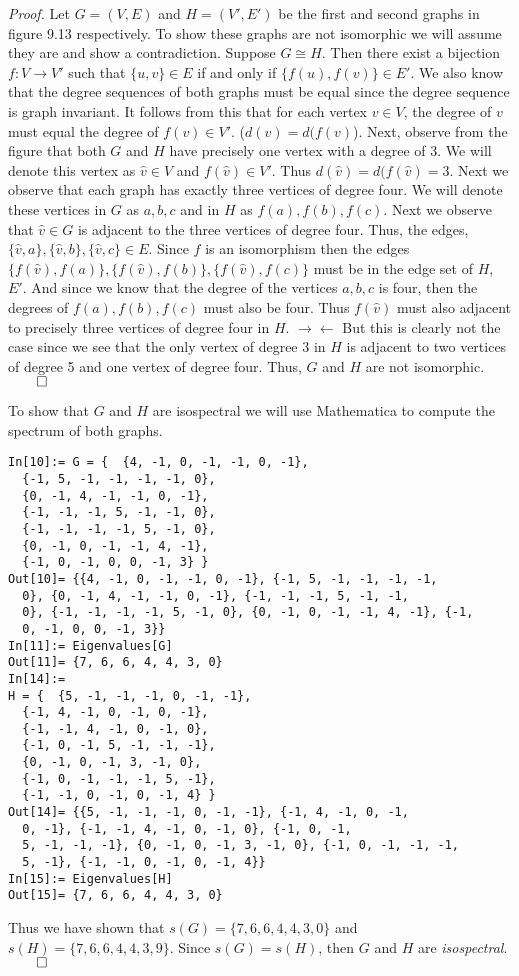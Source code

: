 \documentclass{article}
\begin{document}
\textit{Proof.} Let \(G=(V,E)\) and \(H= (V',E')\) be the first and second graphs in figure 9.13 respectively. To show these graphs are not isomorphic we will assume they are and show a contradiction. Suppose \(G\cong H\). Then there exist a bijection \(f:V\rightarrow V'\) such that \(\{u,v\} \in E\) if and only if \( \{f(u),f(v)\}  \in E'\). We also know that the degree sequences of both graphs must be equal since the degree sequence is graph invariant. It follows from this that for each vertex \(v \in V\), the degree of \(v\) must equal the degree of \( f(v)\in V' \). (\(d(v)=d(f(v)\)). Next, observe from the figure that both \(G\) and \(H\) have precisely one vertex with a degree of 3. We will denote this vertex as \(\hat v \in V\) and \(f(\hat v) \in V'\). Thus \(d(\hat v) = d(f(\hat v) = 3\). Next we observe that each graph has exactly three vertices of degree four. We will denote these vertices in \(G\) as \(a,b,c\) and in \(H\) as \(f(a),f(b),f(c)\). Next we observe that \(\hat v \in G\) is adjacent to the three vertices of degree four. Thus, the edges, \( \{\hat v, a\}, \{\hat v, b\}, \{\hat v,c\} \in E\). Since \(f\) is an isomorphism then the edges \(\{f(\hat v), f(a)\}, \{f(\hat v), f(b)\}, \{f(\hat v),f(c)\}\) must be in the edge set of \(H\), \(E'\). And since we know that the degree of the vertices \(a,b,c\) is four, then the degrees of \(f(a),f(b),f(c)\) must also be four. Thus \(f(\hat v)\) must also adjacent to precisely three vertices of degree four in \(H\). \(\rightarrow\!\leftarrow\) But this is clearly not the case since we see that the only vertex of degree 3 in \(H\) is adjacent to two vertices of degree 5 and one vertex of degree four. Thus, \(G\) and \(H\) are not isomorphic. \(\qed\)


\vspace{3mm} To show that \(G\) and \(H\) are isospectral we will use Mathematica to compute the spectrum of both graphs. 
\begin{verbatim}
In[10]:= G = {  {4, -1, 0, -1, -1, 0, -1},
  {-1, 5, -1, -1, -1, -1, 0},
  {0, -1, 4, -1, -1, 0, -1},
  {-1, -1, -1, 5, -1, -1, 0},
  {-1, -1, -1, -1, 5, -1, 0},
  {0, -1, 0, -1, -1, 4, -1},
  {-1, 0, -1, 0, 0, -1, 3} }
Out[10]= {{4, -1, 0, -1, -1, 0, -1}, {-1, 5, -1, -1, -1, -1, 
  0}, {0, -1, 4, -1, -1, 0, -1}, {-1, -1, -1, 5, -1, -1, 
  0}, {-1, -1, -1, -1, 5, -1, 0}, {0, -1, 0, -1, -1, 4, -1}, {-1, 
  0, -1, 0, 0, -1, 3}}
In[11]:= Eigenvalues[G]
Out[11]= {7, 6, 6, 4, 4, 3, 0}
In[14]:= 
H = {  {5, -1, -1, -1, 0, -1, -1},
  {-1, 4, -1, 0, -1, 0, -1},
  {-1, -1, 4, -1, 0, -1, 0},
  {-1, 0, -1, 5, -1, -1, -1},
  {0, -1, 0, -1, 3, -1, 0},
  {-1, 0, -1, -1, -1, 5, -1},
  {-1, -1, 0, -1, 0, -1, 4} }
Out[14]= {{5, -1, -1, -1, 0, -1, -1}, {-1, 4, -1, 0, -1, 
  0, -1}, {-1, -1, 4, -1, 0, -1, 0}, {-1, 0, -1, 
  5, -1, -1, -1}, {0, -1, 0, -1, 3, -1, 0}, {-1, 0, -1, -1, -1, 
  5, -1}, {-1, -1, 0, -1, 0, -1, 4}}
In[15]:= Eigenvalues[H]
Out[15]= {7, 6, 6, 4, 4, 3, 0}
\end{verbatim}
Thus we have shown that \(s(G)=\{7,6,6,4,4,3,0\}\) and \(s(H)=\{7,6,6,4,4,3,9\}\). Since \(s(G)=s(H)\), then \(G\) and \(H\) are \textit{isospectral}. \(\qed\)
\end{document}

